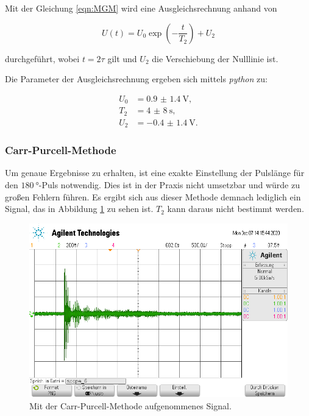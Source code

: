 Mit der Gleichung \eqref{eqn:MGM} wird eine Ausgleichsrechnung anhand von 

\begin{equation*}
  U\left(t\right) = U_0 \exp{\left(-\frac{t}{T_2}\right)} + U_2
\end{equation*}

durchgeführt, wobei $t = 2\tau$ gilt und $U_2$ die Verschiebung der Nulllinie ist. 

Die Parameter der Ausgleichsrechnung ergeben sich mittels \textit{python} zu:

\begin{align}
  U_0 &= \SI{0.9(14)}{\volt},\\
  T_2 &= \SI{4(8)}{\second},\\
  U_2 &= \SI{-0.4(14)}{\volt}.
\end{align}

\subsubsection{Carr-Purcell-Methode}

Um genaue Ergebnisse zu erhalten, ist eine exakte Einstellung der Pulslänge für den $\SI{180}{\degree}$-Puls notwendig. Dies ist 
in der Praxis nicht umsetzbar und würde zu großen Fehlern führen. Es ergibt sich aus dieser Methode demnach lediglich ein Signal,
das in Abbildung \ref{fig:cpm} zu sehen ist. $T_2$ kann daraus nicht bestimmt werden.  

\begin{figure}
  \centering
  \includegraphics[scale=0.4]{content/scope_6.png}
  \caption{Mit der Carr-Purcell-Methode aufgenommenes Signal.}
  \label{fig:cpm}
\end{figure}

